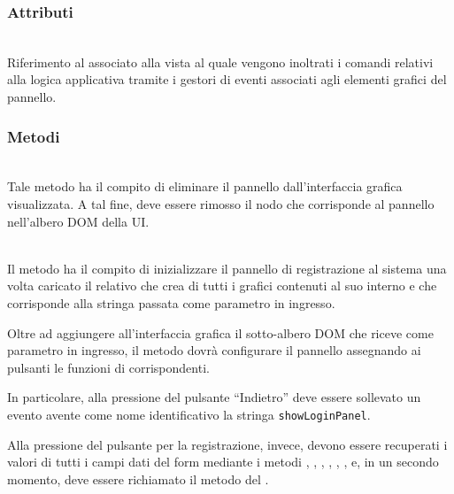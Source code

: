 \subsubsection*{Attributi}
\begin{description}
  \item{}\\
  Riferimento al  associato alla vista al quale vengono inoltrati i comandi relativi alla logica applicativa tramite i gestori di eventi associati agli elementi grafici del pannello.
\end{description}

\subsubsection*{Metodi}
\begin{description}
  \item{}\\
  Tale metodo ha il compito di eliminare il pannello dall’interfaccia grafica visualizzata. A tal fine, deve essere rimosso il nodo che corrisponde al pannello nell’albero DOM della UI\@.
  
  \item{}\\
  	Il metodo ha il compito di inizializzare il pannello di registrazione al sistema una volta caricato il relativo  che crea di tutti i  grafici contenuti al suo interno e che corrisponde alla stringa passata come parametro in ingresso.
	
	Oltre ad aggiungere all'interfaccia grafica il sotto-albero DOM che riceve come parametro in ingresso, il metodo dovrà configurare il pannello assegnando ai pulsanti le funzioni di  corrispondenti.
	
	In particolare, alla pressione del pulsante ``Indietro'' deve essere sollevato un evento avente come nome identificativo la stringa \verb'showLoginPanel'.
	
  Alla pressione del pulsante per la registrazione, invece, devono essere recuperati i valori di tutti i campi dati del form mediante i metodi , , , , , ,  e, in un secondo momento, deve essere richiamato il metodo  del .

\end{description}


